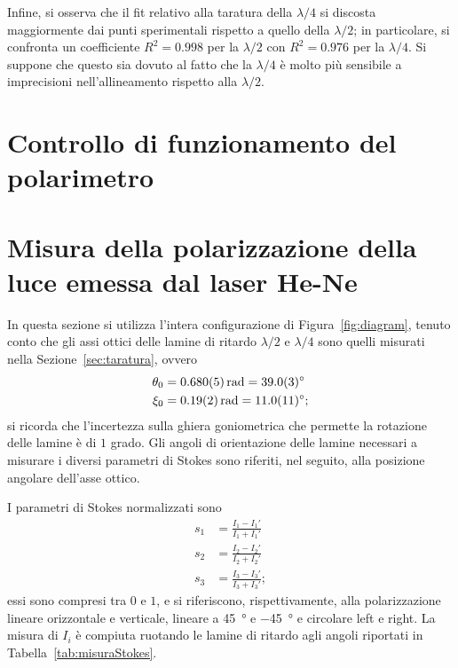 \documentclass[10pt,oneside,a4paper]{article}
\begin{document}
\begin{multicols}{2}
Infine, si osserva che il fit relativo alla taratura della $\lambda/4$ si discosta maggiormente dai punti sperimentali rispetto a quello della $\lambda/2$; in particolare, si confronta un coefficiente $R^2 = 0.998$ per la $\lambda/2$ con $R^2 = 0.976$ per la $\lambda/4$. Si suppone che questo sia dovuto al fatto che la $\lambda/4$ è molto più sensibile a imprecisioni nell'allineamento rispetto alla $\lambda/2$.


\section{Controllo di funzionamento del polarimetro}

\section{Misura della polarizzazione della luce emessa dal laser He-Ne}
In questa sezione si utilizza l'intera configurazione di Figura~\ref{fig:diagram}, tenuto conto che gli assi ottici delle lamine di ritardo $\lambda / 2$ e $\lambda / 4$ sono quelli misurati nella Sezione~\ref{sec:taratura}, ovvero
\[
\begin{aligned}
\theta_0 &= \SI{0.680\pm0.005}{rad} = \SI{39.0 \pm 0.3}{\degree} \\
\xi_0 &= \SI{0.19\pm0.02}{rad} = \SI{11.0 \pm 1.1}{\degree};
\end{aligned}
\]
si ricorda che l'incertezza sulla ghiera goniometrica che permette la rotazione delle lamine è di $1$ grado. Gli angoli di orientazione delle lamine necessari a misurare i diversi parametri di Stokes sono riferiti, nel seguito, alla posizione angolare dell'asse ottico.

I parametri di Stokes normalizzati sono
\[
\begin{aligned}
s_1 &= \frac{I_1 - I_1'}{I_1 + I_1'} \\
s_2 &= \frac{I_2 - I_2'}{I_2 + I_2'} \\
s_3 &= \frac{I_3 - I_3'}{I_3 + I_3'};
\end{aligned}
\]
essi sono compresi tra $0$ e $1$, e si riferiscono, rispettivamente, alla polarizzazione lineare orizzontale e verticale, lineare a \SI{45}{\degree} e \SI{-45}{\degree} e circolare left e right. La misura di $I_i$ è compiuta ruotando le lamine di ritardo agli angoli riportati in Tabella~\ref{tab:misuraStokes}.


\end{multicols}
\end{document}
